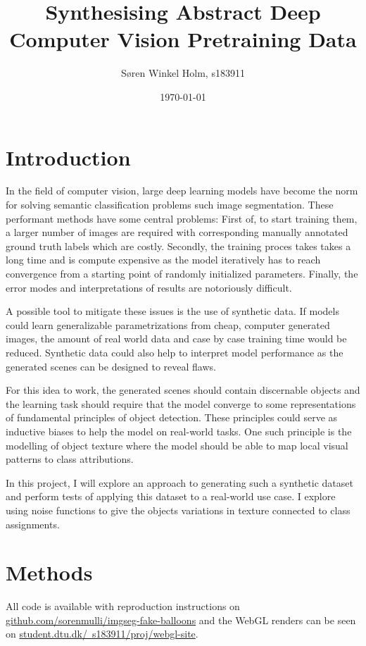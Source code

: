 \documentclass[12pt,fleqn]{article}
\title{Synthesising Abstract Deep Computer Vision Pretraining Data}
\author{Søren Winkel Holm, s183911}
\date{\today}
\begin{document}
\maketitle
\thispagestyle{fancy}
\tableofcontents
\newpage

\section{Introduction}%
\label{sec:intro}
In the field of computer vision, large deep learning models have become the norm for solving semantic classification problems such image segmentation.
These performant methods have some central problems:
First of, to start training them, a larger number of images are required with corresponding manually annotated ground truth labels which are costly.
Secondly, the training proces takes takes a long time and is compute expensive as the model iteratively has to reach convergence from a starting point of randomly initialized parameters.
Finally, the error modes and interpretations of results are notoriously difficult.

A possible tool to mitigate these issues is the use of synthetic data.
If models could learn generalizable parametrizations from cheap, computer generated images, the amount of real world data and case by case training time would be reduced.
Synthetic data could also help to interpret model performance as the generated scenes can be designed to reveal flaws.

For this idea to work, the generated scenes should contain discernable objects and the learning task should require that the model converge to some representations of fundamental principles of object detection.
These principles could serve as inductive biases to help the model on real-world tasks.
One such principle is the modelling of object texture where the model should be able to map local visual patterns to class attributions.

In this project, I will explore an approach to generating such a synthetic dataset and perform tests of applying this dataset to a real-world use case.
I explore using noise functions to give the objects variations in texture connected to class assignments.

\section{Methods}%
\label{sec:method}
All code is available with reproduction instructions on \href{https://github.com/sorenmulli/imgseg-fake-balloons}{github.com/sorenmulli/imgseg-fake-balloons} and the WebGL renders can be seen on \href{https://www.student.dtu.dk/~s183911/proj/webgl-site/index.html}{student.dtu.dk/~s183911/proj/webgl-site}.
\end{document}
